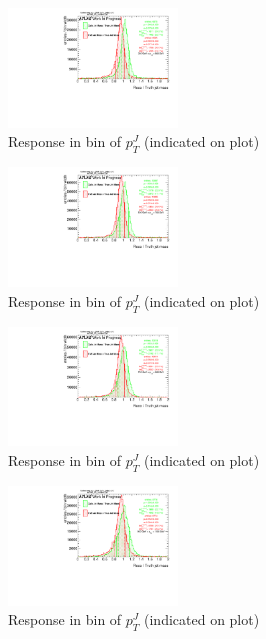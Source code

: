\begin{figure}

\includegraphics[width=0.4\textwidth]{appendixB/mTAS_W_calibmCal_20:07:01-03-11-2016/8ResponsePTJ_h_JetRatio_mJ02CALO.pdf}
\caption{Response in bin of  $p_{T}^{J}$ (indicated on plot)} 

\end{figure}

\begin{figure}

\includegraphics[width=0.4\textwidth]{appendixB/mTAS_W_calibmCal_20:07:01-03-11-2016/8ResponsePTJ_h_JetRatio_mJ03CALO.pdf}
\caption{Response in bin of  $p_{T}^{J}$ (indicated on plot)} 

\end{figure}

\begin{figure}

\includegraphics[width=0.4\textwidth]{appendixB/mTAS_W_calibmCal_20:07:01-03-11-2016/8ResponsePTJ_h_JetRatio_mJ04CALO.pdf}
\caption{Response in bin of  $p_{T}^{J}$ (indicated on plot)} 

\end{figure}

\begin{figure}

\includegraphics[width=0.4\textwidth]{appendixB/mTAS_W_calibmCal_20:07:01-03-11-2016/8ResponsePTJ_h_JetRatio_mJ05CALO.pdf}
\caption{Response in bin of  $p_{T}^{J}$ (indicated on plot)} 

\end{figure}

